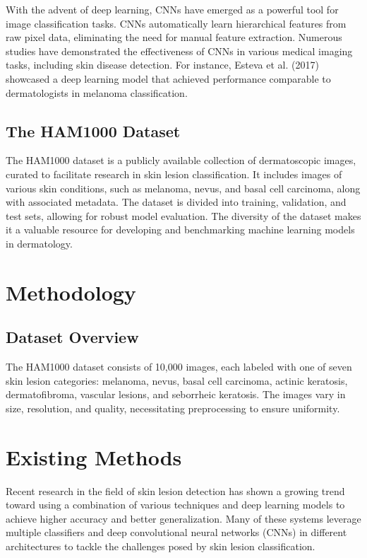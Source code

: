 \documentclass{article}
\begin{document}
With the advent of deep learning, CNNs have emerged as a powerful tool for image classification tasks. CNNs automatically learn hierarchical features from raw pixel data, eliminating the need for manual feature extraction. Numerous studies have demonstrated the effectiveness of CNNs in various medical imaging tasks, including skin disease detection. For instance, Esteva et al. (2017) showcased a deep learning model that achieved performance comparable to dermatologists in melanoma classification.

\subsection{The HAM1000 Dataset}
The HAM1000 dataset is a publicly available collection of dermatoscopic images, curated to facilitate research in skin lesion classification. It includes images of various skin conditions, such as melanoma, nevus, and basal cell carcinoma, along with associated metadata. The dataset is divided into training, validation, and test sets, allowing for robust model evaluation. The diversity of the dataset makes it a valuable resource for developing and benchmarking machine learning models in dermatology.

\section{Methodology}
\subsection{Dataset Overview}
The HAM1000 dataset consists of 10,000 images, each labeled with one of seven skin lesion categories: melanoma, nevus, basal cell carcinoma, actinic keratosis, dermatofibroma, vascular lesions, and seborrheic keratosis. The images vary in size, resolution, and quality, necessitating preprocessing to ensure uniformity.



\section{Existing Methods}

Recent research in the field of skin lesion detection has shown a growing trend toward using a combination of various techniques and deep learning models to achieve higher accuracy and better generalization. Many of these systems leverage multiple classifiers and deep convolutional neural networks (CNNs) in different architectures to tackle the challenges posed by skin lesion classification.
\end{document}
